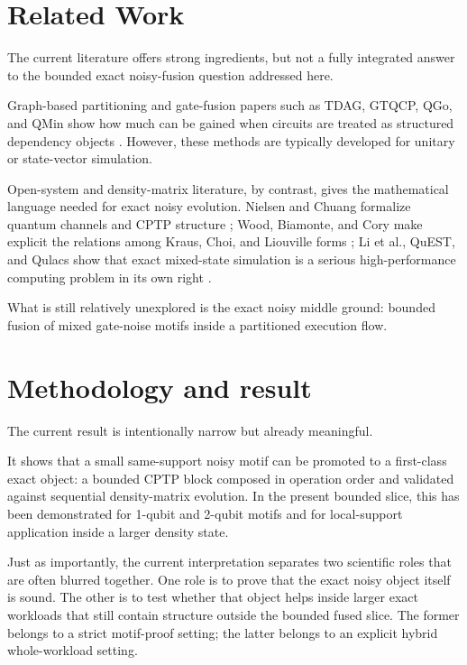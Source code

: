 \section{Related Work}

The current literature offers strong ingredients, but not a fully integrated
answer to the bounded exact noisy-fusion question addressed here.

Graph-based partitioning and gate-fusion papers such as TDAG, GTQCP, QGo, and
QMin show how much can be gained when circuits are treated as structured
dependency objects \cite{r7,r8,r10,r9}. However, these methods are typically
developed for unitary or state-vector simulation.

Open-system and density-matrix literature, by contrast, gives the mathematical
language needed for exact noisy evolution. Nielsen and Chuang formalize quantum
channels and CPTP structure \cite{r2}; Wood, Biamonte, and Cory make explicit
the relations among Kraus, Choi, and Liouville forms \cite{r3}; Li et al.,
QuEST, and Qulacs show that exact mixed-state simulation is a serious
high-performance computing problem in its own right \cite{r4,r5,r6}.

What is still relatively unexplored is the exact noisy middle ground: bounded
fusion of mixed gate-noise motifs inside a partitioned execution flow.

\section{Methodology and result}

The current result is intentionally narrow but already meaningful.

It shows that a small same-support noisy motif can be promoted to a first-class
exact object: a bounded CPTP block composed in operation order and validated
against sequential density-matrix evolution. In the present bounded slice, this
has been demonstrated for 1-qubit and 2-qubit motifs and for local-support
application inside a larger density state.

Just as importantly, the current interpretation separates two scientific roles
that are often blurred together. One role is to prove that the exact noisy
object itself is sound. The other is to test whether that object helps inside
larger exact workloads that still contain structure outside the bounded fused
slice. The former belongs to a strict motif-proof setting; the latter belongs
to an explicit hybrid whole-workload setting.

